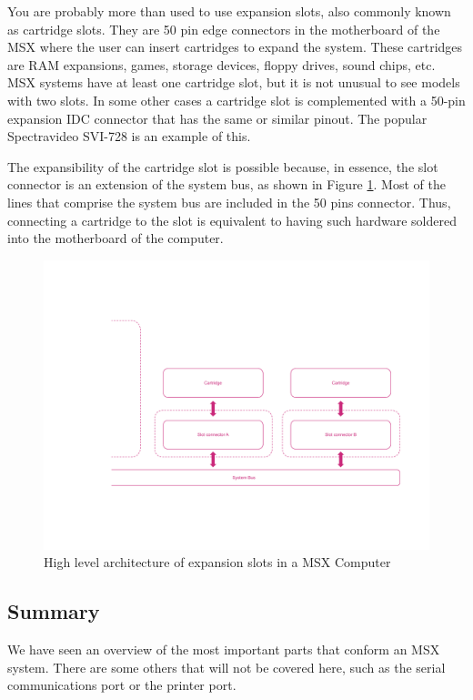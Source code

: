 You are probably more than used to use expansion slots, also commonly known as cartridge slots. They are 50 pin edge connectors in the motherboard of the MSX where the user can insert cartridges to expand the system. These cartridges are RAM expansions, games, storage devices, floppy drives, sound chips, etc. MSX systems have at least one cartridge slot, but it is not unusual to see models with two slots. In some other cases a cartridge slot is complemented with a 50-pin expansion IDC connector that has the same or similar pinout. The popular Spectravideo SVI-728 is an example of this. 

The expansibility of the cartridge slot is possible because, in essence, the slot connector is an extension of the system bus, as shown in Figure \ref{fig:msx-arch-slots}. Most of the lines that comprise the system bus are included in the 50 pins connector. Thus, connecting a cartridge to the slot is equivalent to having such hardware soldered into the motherboard of the computer.

\begin{figure}
	\centering
	\includegraphics[width=1\linewidth,trim={0cm 120 0 100}]{images/figures/msx-arch-slots}
	\caption{High level architecture of expansion slots in a MSX Computer}
	\label{fig:msx-arch-slots}
\end{figure}

\subsection{Summary}

We have seen an overview of the most important parts that conform an MSX system. There are some others that will not be covered here, such as the serial communications port or the printer port. 

